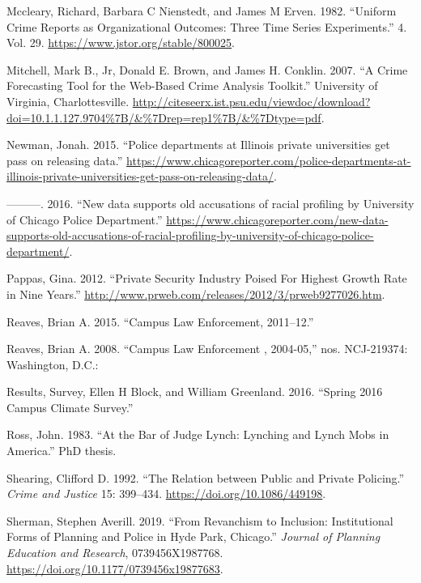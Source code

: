 \documentclass{ucetd}
\begin{document}
\leavevmode\hypertarget{ref-Mccleary1982}{}%
Mccleary, Richard, Barbara C Nienstedt, and James M Erven. 1982.
``Uniform Crime Reports as Organizational Outcomes: Three Time Series
Experiments.'' 4. Vol. 29. \url{https://www.jstor.org/stable/800025}.

\leavevmode\hypertarget{ref-Mitchell2007}{}%
Mitchell, Mark B., Jr, Donald E. Brown, and James H. Conklin. 2007. ``A
Crime Forecasting Tool for the Web-Based Crime Analysis Toolkit.''
University of Virginia, Charlottesville.
\url{http://citeseerx.ist.psu.edu/viewdoc/download?doi=10.1.1.127.9704\%7B/\&\%7Drep=rep1\%7B/\&\%7Dtype=pdf}.

\leavevmode\hypertarget{ref-Newman2015}{}%
Newman, Jonah. 2015. ``Police departments at Illinois private
universities get pass on releasing data.''
\url{https://www.chicagoreporter.com/police-departments-at-illinois-private-universities-get-pass-on-releasing-data/}.

\leavevmode\hypertarget{ref-Newman2016}{}%
---------. 2016. ``New data supports old accusations of racial profiling
by University of Chicago Police Department.''
\url{https://www.chicagoreporter.com/new-data-supports-old-accusations-of-racial-profiling-by-university-of-chicago-police-department/}.

\leavevmode\hypertarget{ref-Pappas2012}{}%
Pappas, Gina. 2012. ``Private Security Industry Poised For Highest
Growth Rate in Nine Years.''
\url{http://www.prweb.com/releases/2012/3/prweb9277026.htm}.

\leavevmode\hypertarget{ref-Reaves2015}{}%
Reaves, Brian A. 2015. ``Campus Law Enforcement, 2011--12.''

\leavevmode\hypertarget{ref-Reaves2008}{}%
Reaves, Brian A. 2008. ``Campus Law Enforcement , 2004-05,'' nos.
NCJ-219374: Washington, D.C.:

\leavevmode\hypertarget{ref-Results2016}{}%
Results, Survey, Ellen H Block, and William Greenland. 2016. ``Spring
2016 Campus Climate Survey.''

\leavevmode\hypertarget{ref-Ross1983}{}%
Ross, John. 1983. ``At the Bar of Judge Lynch: Lynching and Lynch Mobs
in America.'' PhD thesis.

\leavevmode\hypertarget{ref-Shearing1992}{}%
Shearing, Clifford D. 1992. ``The Relation between Public and Private
Policing.'' \emph{Crime and Justice} 15: 399--434.
\url{https://doi.org/10.1086/449198}.

\leavevmode\hypertarget{ref-Sherman2019}{}%
Sherman, Stephen Averill. 2019. ``From Revanchism to Inclusion:
Institutional Forms of Planning and Police in Hyde Park, Chicago.''
\emph{Journal of Planning Education and Research}, 0739456X1987768.
\url{https://doi.org/10.1177/0739456x19877683}.
\end{document}
